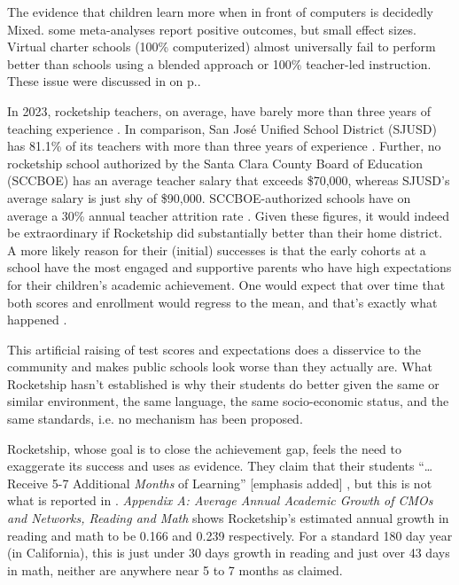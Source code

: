 The evidence that children learn more when in front of computers is decidedly Mixed. some meta-analyses report positive outcomes, but small effect sizes. Virtual charter schools (100\% computerized) almost universally fail to perform better than schools using a blended approach or 100\% teacher-led instruction. These issue were discussed in  on p.\pageref{sec:types-instruction}.

In 2023, rocketship teachers, on average, have barely more than three years of teaching experience \parencite{SCCOE2014}. In comparison, San José Unified School District (SJUSD) has 81.1\% of its teachers with more than three years of experience \parencite{USNews2023}. Further, no rocketship school authorized by the Santa Clara County Board of Education (SCCBOE) has an average teacher salary that exceeds \$70,000, whereas SJUSD's average salary is just shy of \$90,000. SCCBOE-authorized schools have on average a 30\% annual teacher attrition rate \parencite{SCCOE2014}. Given these figures, it would indeed be extraordinary if Rocketship did substantially better than their home district. A more likely reason for their (initial) successes is that the early cohorts at a school have the most engaged and supportive parents who have high expectations for their children's academic achievement. One would expect that over time that both scores and enrollment would regress to the mean, and that's exactly what happened \parencite{SCCOE2014}. 

This artificial raising of test scores and expectations does a disservice to the community and makes public schools look worse than they actually are. What Rocketship hasn't established is why their students do better given the same or similar environment, the same language, the same socio-economic status, and the same standards, i.e. no mechanism has been proposed.

Rocketship, whose goal is to close the achievement gap, feels the need to exaggerate its success and uses \textcite{Raymond.etal2023} as evidence. They claim that their students ``\ldots{} Receive 5-7 Additional \textit{Months} of Learning'' [emphasis added] \parencite{RSED2023}, but this is not what is reported in \textcite{Raymond.etal2023}. \textit{Appendix A: Average Annual Academic Growth of CMOs and Networks, Reading and Math} \textcite[132]{Raymond.etal2023} shows Rocketship's estimated annual growth in reading and math to be 0.166 and 0.239 respectively. For a standard 180 day year (in California), this is just under 30 days growth in reading and just over 43 days in math, neither are anywhere near 5 to 7 months as claimed.

